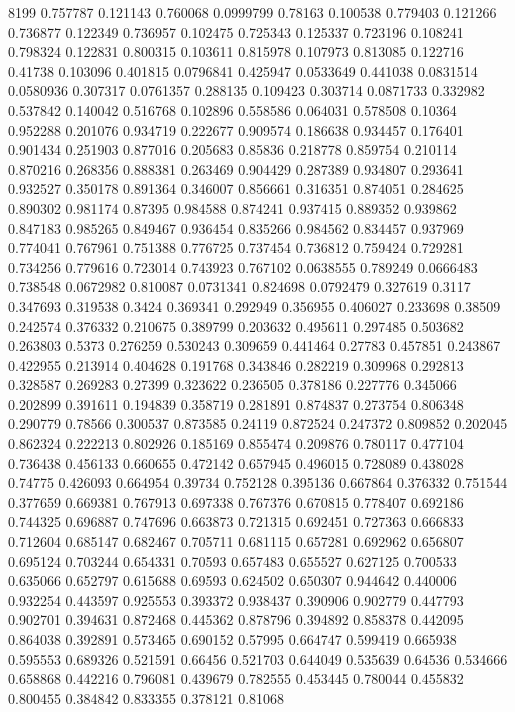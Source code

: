 8199
0.757787 0.121143
0.760068 0.0999799
0.78163 0.100538
0.779403 0.121266
0.736877 0.122349
0.736957 0.102475
0.725343 0.125337
0.723196 0.108241
0.798324 0.122831
0.800315 0.103611
0.815978 0.107973
0.813085 0.122716
0.41738 0.103096
0.401815 0.0796841
0.425947 0.0533649
0.441038 0.0831514
0.0580936 0.307317
0.0761357 0.288135
0.109423 0.303714
0.0871733 0.332982
0.537842 0.140042
0.516768 0.102896
0.558586 0.064031
0.578508 0.10364
0.952288 0.201076
0.934719 0.222677
0.909574 0.186638
0.934457 0.176401
0.901434 0.251903
0.877016 0.205683
0.85836 0.218778
0.859754 0.210114
0.870216 0.268356
0.888381 0.263469
0.904429 0.287389
0.934807 0.293641
0.932527 0.350178
0.891364 0.346007
0.856661 0.316351
0.874051 0.284625
0.890302 0.981174
0.87395 0.984588
0.874241 0.937415
0.889352 0.939862
0.847183 0.985265
0.849467 0.936454
0.835266 0.984562
0.834457 0.937969
0.774041 0.767961
0.751388 0.776725
0.737454 0.736812
0.759424 0.729281
0.734256 0.779616
0.723014 0.743923
0.767102 0.0638555
0.789249 0.0666483
0.738548 0.0672982
0.810087 0.0731341
0.824698 0.0792479
0.327619 0.3117
0.347693 0.319538
0.3424 0.369341
0.292949 0.356955
0.406027 0.233698
0.38509 0.242574
0.376332 0.210675
0.389799 0.203632
0.495611 0.297485
0.503682 0.263803
0.5373 0.276259
0.530243 0.309659
0.441464 0.27783
0.457851 0.243867
0.422955 0.213914
0.404628 0.191768
0.343846 0.282219
0.309968 0.292813
0.328587 0.269283
0.27399 0.323622
0.236505 0.378186
0.227776 0.345066
0.202899 0.391611
0.194839 0.358719
0.281891 0.874837
0.273754 0.806348
0.290779 0.78566
0.300537 0.873585
0.24119 0.872524
0.247372 0.809852
0.202045 0.862324
0.222213 0.802926
0.185169 0.855474
0.209876 0.780117
0.477104 0.736438
0.456133 0.660655
0.472142 0.657945
0.496015 0.728089
0.438028 0.74775
0.426093 0.664954
0.39734 0.752128
0.395136 0.667864
0.376332 0.751544
0.377659 0.669381
0.767913 0.697338
0.767376 0.670815
0.778407 0.692186
0.744325 0.696887
0.747696 0.663873
0.721315 0.692451
0.727363 0.666833
0.712604 0.685147
0.682467 0.705711
0.681115 0.657281
0.692962 0.656807
0.695124 0.703244
0.654331 0.70593
0.657483 0.655527
0.627125 0.700533
0.635066 0.652797
0.615688 0.69593
0.624502 0.650307
0.944642 0.440006
0.932254 0.443597
0.925553 0.393372
0.938437 0.390906
0.902779 0.447793
0.902701 0.394631
0.872468 0.445362
0.878796 0.394892
0.858378 0.442095
0.864038 0.392891
0.573465 0.690152
0.57995 0.664747
0.599419 0.665938
0.595553 0.689326
0.521591 0.66456
0.521703 0.644049
0.535639 0.64536
0.534666 0.658868
0.442216 0.796081
0.439679 0.782555
0.453445 0.780044
0.455832 0.800455
0.384842 0.833355
0.378121 0.81068
